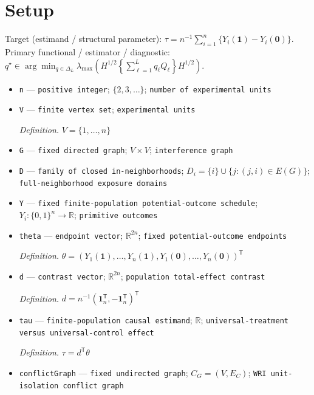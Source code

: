 \documentclass{article}
\begin{document}
\section{Setup}

Target (estimand / structural parameter): \(\tau=n^{-1}\sum_{i=1}^{n}\{Y_i(\mathbf 1)-Y_i(\mathbf 0)\}\).
Primary functional / estimator / diagnostic: \(q^{\star}\in\arg\min_{q\in\Delta_L}\lambda_{\max}\!\left(H^{1/2}\left\{\sum_{\ell=1}^{L}q_{\ell}Q_{\ell}\right\}H^{1/2}\right)\).
\begin{itemize}
  \item \texttt{n} --- \texttt{positive integer}; \(\{2,3,\ldots\}\); \texttt{number of experimental units}
  \item \texttt{V} --- \texttt{finite vertex set}; \texttt{experimental units}
  \par\smallskip\noindent\emph{Definition.} \(V=\{1,\ldots,n\}\)
  \item \texttt{G} --- \texttt{fixed directed graph}; \(V\times V\); \texttt{interference graph}
  \item \texttt{D} --- \texttt{family of closed in-\allowbreak{}neighborhoods}; \(D_i=\{i\}\cup\{j:(j,i)\in E(G)\}\); \texttt{full-\allowbreak{}neighborhood exposure domains}
  \item \texttt{Y} --- \texttt{fixed finite-\allowbreak{}population potential-\allowbreak{}outcome schedule}; \(Y_i:\{0,1\}^{n}\to\mathbb R\); \texttt{primitive outcomes}
  \item \texttt{theta} --- \texttt{endpoint vector}; \(\mathbb R^{2n}\); \texttt{fixed potential-\allowbreak{}outcome endpoints}
  \par\smallskip\noindent\emph{Definition.} \(\theta=(Y_1(\mathbf 1),\ldots,Y_n(\mathbf 1),Y_1(\mathbf 0),\ldots,Y_n(\mathbf 0))^{\mathsf T}\)
  \item \texttt{d} --- \texttt{contrast vector}; \(\mathbb R^{2n}\); \texttt{population total-\allowbreak{}effect contrast}
  \par\smallskip\noindent\emph{Definition.} \(d=n^{-1}(\mathbf 1_n^{\mathsf T},-\mathbf 1_n^{\mathsf T})^{\mathsf T}\)
  \item \texttt{tau} --- \texttt{finite-\allowbreak{}population causal estimand}; \(\mathbb R\); \texttt{universal-\allowbreak{}treatment versus universal-\allowbreak{}control effect}
  \par\smallskip\noindent\emph{Definition.} \(\tau=d^{\mathsf T}\theta\)
  \item \texttt{conflictGraph} --- \texttt{fixed undirected graph}; \(C_G=(V,E_C)\); \texttt{WRI unit-\allowbreak{}isolation conflict graph}

\end{itemize}
\end{document}
